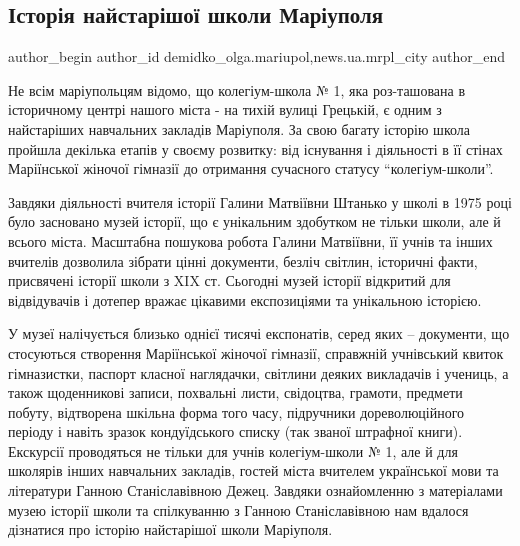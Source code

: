  
 
 
 
 
 
\subsection{Історія найстарішої школи Маріуполя}
\label{sec:20_02_2018.stz.news.ua.mrpl_city.1.istoria_najstarishoj_shkoly_mrpl}
 
\ifcmt
 author_begin
   author_id demidko_olga.mariupol,news.ua.mrpl_city
 author_end
\fi


Не всім маріупольцям відомо, що колегіум-школа № 1, яка роз\hyp{}ташована в
історичному центрі нашого міста - на тихій вулиці Грецькій, є одним з
найстаріших навчальних закладів Маріуполя. За свою багату історію школа пройшла
декілька етапів у своєму розвитку: від існування і діяльності в її стінах
Маріїнської жіночої гімназії до отримання сучасного статусу \enquote{колегіум-школи}. 


Завдяки діяльності вчителя історії Галини Матвіївни Штанько у школі в 1975 році
було засновано музей історії, що є унікальним здобутком не тільки школи, але й
всього міста. Масштабна пошукова робота Галини Матвіївни, її учнів та інших
вчителів дозволила зібрати цінні документи, безліч світлин, історичні факти,
присвячені історії школи з XIX ст. Сьогодні музей історії відкритий для
відвідувачів і дотепер вражає цікавими експозиціями та унікальною історією.


У музеї налічується близько однієї тисячі експонатів, серед яких – документи,
що стосуються створення Маріїнської жіночої гімназії, справжній учнівський
квиток гімназистки, паспорт класної наглядачки, світлини деяких викладачів і
учениць, а також щоденникові записи, похвальні листи, свідоцтва, грамоти,
предмети побуту, відтворена шкільна форма того часу, підручники дореволюційного
періоду і навіть зразок кондуїдського списку (так званої штрафної книги).
Екскурсії проводяться не тільки для учнів колегіум-школи № 1, але й для
школярів інших навчальних закладів, гостей міста вчителем української мови та
літератури Ганною Станіславівною Дежец. Завдяки ознайомленню з матеріалами
музею історії школи та спілкуванню з Ганною Станіславівною нам вдалося
дізнатися про історію найстарішої школи Маріуполя.

